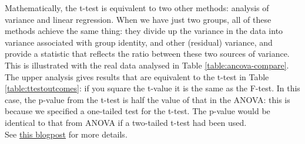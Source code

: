 \begin{tcolorbox}[colback=Black!5!Lightgray,colframe=black!75!black,coltitle=white,title= {T-tests, analysis of variance, and linear regression}]
Mathematically, the t-test is equivalent to two other methods: analysis of variance and linear regression. When we have just two groups, all of these methods achieve the same thing: they divide up the variance in the data into variance associated with group identity, and other (residual) variance, and provide a statistic that reflects the ratio between these two sources of variance. This is illustrated with the real data analysed in Table \ref{table:ancova-compare}. The upper analysis gives results that are equivalent to the t-test in Table \ref{table:ttestoutcomes}: if you square the t-value it is the same as the F-test. In this case, the p-value from the t-test is half the value of that in the ANOVA: this is because we specified a one-tailed test for the t-test. The p-value would be identical to that from ANOVA if a two-tailed t-test had been used.\\
See \href{http://deevybee.blogspot.com/2017/11/anova-t-tests-and-regression-different.html}{this blogpost} for more details.
\end{tcolorbox}